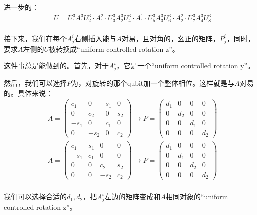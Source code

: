 进一步的：
\begin{equation}
\begin{split}
&U=U^3_1 A^3_1 U^3_2 \cdot A^2_1 \cdot U^3_3 A^3_2 U^3_4 \cdot A^1_1 \cdot U^3_5  A^3_3 U^3_6 \cdot A^2_2 \cdot U^3_7 A^3_4 U^3_8\\
\end{split}
\end{equation}

接下来，我们在每个$A^i_j$右侧插入能与$A$对易，且对角的，幺正的矩阵，$P^i_j$，同时，要求$A$左侧的$U$被转换成``uniform controlled rotation z''。

这件事总是能做到的。首先，对于$A^i_j$，它是一个``uniform controlled rotation y''。

然后，我们可以选择$P$为，对旋转的那个qubit加一个整体相位。这样就是与$A$对易的。具体来说：
\begin{equation}
\begin{split}
&A=\begin{pmatrix} c_1 & 0 & s_1 & 0 \\ 0 & c_2 & 0 & s_2 \\ -s_1 & 0 & c_1 & 0 \\ 0 & -s_2 & 0 & c_2\end{pmatrix} 
\to P= \begin{pmatrix} d_1 & 0 & 0 & 0 \\ 0 & d_2 & 0 & 0 \\ 0 & 0 & d_1 & 0 \\ 0 & 0 & 0 & d_2 \end{pmatrix}\\
&A=\begin{pmatrix} c_1 & s_1 & 0 & 0 \\ -s_1 & c_1 & 0 & 0 \\ 0 & 0 & c_2 & s_2 \\ 0 & 0 & -s_2 & c_2\end{pmatrix} 
\to P= \begin{pmatrix} d_1 & 0 & 0 & 0 \\ 0 & d_1 & 0 & 0 \\ 0 & 0 & d_2 & 0 \\ 0 & 0 & 0 & d_2 \end{pmatrix}\\
\end{split}
\end{equation}

我们可以选择合适的$d_1,d_2$，把$A^i_j$左边的矩阵变成和$A$相同对象的``uniform controlled rotation z''。

